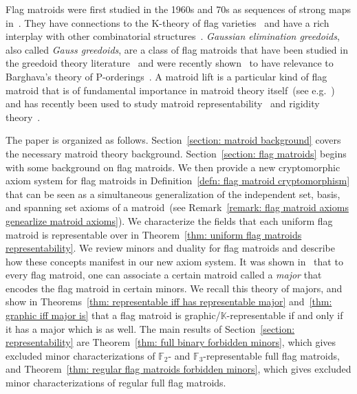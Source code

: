 \documentclass[12pt]{article}
\theoremstyle{definition}
\begin{document}
Flag matroids were first studied in the 1960s and 70s as sequences of strong maps in~\cite{higgs1968strong,kennedy1975majors,cheung1976combinatorial,kung1977core}.
They have connections to the K-theory of flag varieties~\cite{cameron2017flag,dinu2021k,jarra2024flag}
and have a rich interplay with other combinatorial structures~\cite{de2007natural,benedetti2024lattice,benedetti2019quotients,fujishige2022compression}.
\emph{Gaussian elimination greedoids}, also called \emph{Gauss greedoids},
are a class of flag matroids that have been studied in the greedoid theory literature~\cite{greedoids}
and were recently shown~\cite{grinberg2021greedoid,grinberga2020bhargava} to have relevance to Barghava's theory of P-orderings~\cite{bhargava1997p}.
A matroid lift is a particular kind of flag matroid that is of fundamental importance in matroid theory itself~(see e.g.~\cite[Chapter~7]{oxley}) and has recently been used to study matroid representability~\cite{bernstein2024matroid} and rigidity theory~\cite{bernstein2022generic,clinch2021abstract}.

The paper is organized as follows.
Section~\ref{section: matroid background} covers the necessary matroid theory background.
Section~\ref{section: flag matroids} begins with some background on flag matroids.
We then provide a new cryptomorphic axiom system for flag matroids in Definition~\ref{defn: flag matroid cryptomorphism} that can be seen as a simultaneous generalization of the independent set, basis, and spanning set axioms of a matroid~(see Remark~\ref{remark: flag matroid axioms genearlize matroid axioms}).
We characterize the fields that each uniform flag matroid is representable over in Theorem~\ref{thm: uniform flag matroids representability}.
We review minors and duality for flag matroids and describe how these concepts manifest in our new axiom system.
It was shown in~\cite{kung1986strong} that to every flag matroid, one can associate a certain matroid called a \emph{major} that encodes the flag matroid in certain minors.
We recall this theory of majors, and show in Theorems~\ref{thm: representable iff has representable major} and~\ref{thm: graphic iff major is} that a flag matroid is graphic/$\mathbb{K}$-representable if and only if it has a major which is as well.
The main results of Section~\ref{section: representability} are Theorem~\ref{thm: full binary forbidden minors}, which gives excluded minor characterizations of $\mathbb{F}_2$- and $\mathbb{F}_3$-representable full flag matroids, and Theorem~\ref{thm: regular flag matroids forbidden minors}, which gives excluded minor characterizations of regular full flag matroids.
\end{document}
